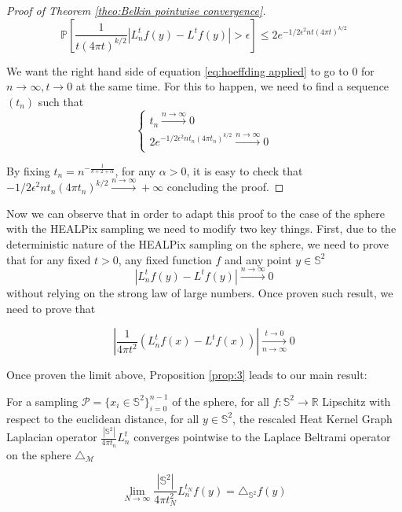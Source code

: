 \begin{proof}[Proof of Theorem \ref{theo:Belkin pointwise convergence}]
\begin{equation}
	\label{eq:hoeffding applied}
	\mathbb{P}\left[\frac{1}{t(4 \pi t)^{k / 2}}\left|L_{n}^{t} f(y)- L^{t} f(y)\right|>\epsilon\right] \leq 2 e^{-1 / 2 \epsilon^{2} n t(4 \pi t)^{k / 2}}
\end{equation}

We want the right hand side of equation \ref{eq:hoeffding applied} to go to $0$ for $n\to\infty, t\to0$ at the same time. For this to happen, we need to find a sequence $(t_n)$ such that 
$$\begin{cases}
t_n\xrightarrow{n\to\infty}0\\
2 e^{-1 / 2 \epsilon^{2} n t_n(4 \pi t_n)^{k / 2}}\xrightarrow{n\to\infty}0\\
\end{cases}$$

By fixing $t_n=n^{-\frac{1}{k+2+\alpha}}$, for any $\alpha>0$, it is easy to check that $-1 / 2 \epsilon^{2} n t_n(4 \pi t_n)^{k / 2}\xrightarrow{n\to\infty}+\infty$ concluding the proof.

\end{proof}

Now we can observe that in order to adapt this proof to the case of the sphere with the HEALPix sampling  we need to modify two key things. First, due to the deterministic nature of the HEALPix sampling on the sphere, we need to prove that for any fixed $t>0$, any fixed function $f$ and any point $y\in\mathbb S^2$ 
$$\left|L_n^tf(y)-L^tf(y)\right|\xrightarrow{n\to \infty} 0$$
without relying on the strong law of large numbers. Once proven such result, we need to prove that

$$\left|\frac{1}{4\pi t^2}\left(L_n^tf(x) - L^tf(x)\right)\right|\xrightarrow[n\to \infty]{t\to 0}0$$

Once proven the limit above, Proposition \ref{prop:3} leads to our main result:
\vspace{1cm}
\begin{theorem}
	For a sampling $\mathcal P = \{x_i\in\mathbb S^2\}_{i=0}^{n-1}$ of the sphere, for all $f: \mathbb S^2 \rightarrow \mathbb R$ Lipschitz with respect to the euclidean distance, for all $y\in\mathbb S^2$, the rescaled Heat Kernel Graph Laplacian operator $\frac{|\mathbb S^2|}{4\pi t_n}L^t_n$ converges pointwise to the Laplace Beltrami operator on the sphere $\triangle_{\mathcal M}$
	
	$$ \lim_{N\to\infty}\frac{|\mathbb S^2|}{4\pi t_N^2} L_n^{t_N}f(y) =  \triangle_{\mathbb S^2}f(y) $$
	\label{theo:pointwise convergence in the healpix case}
\end{theorem}
\vspace{1cm}

